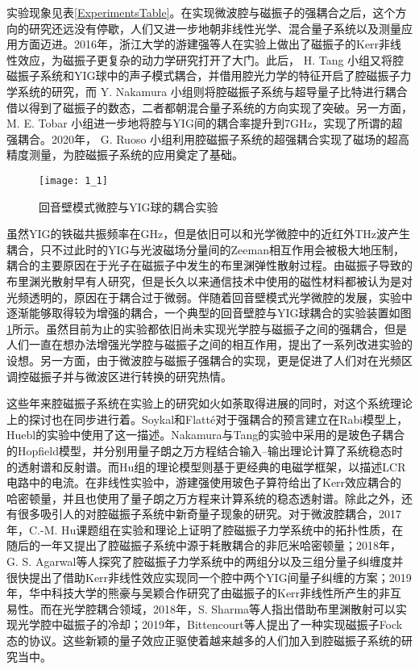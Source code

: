 实验现象见表\ref{ExperimentsTable}。在实现微波腔与磁振子的强耦合之后，这个方向的研究还远没有停歇，人们又进一步地朝非线性光学、混合量子系统以及测量应用方面迈进。2016年，浙江大学的游建强等人在实验上做出了磁振子的Kerr非线性效应\cite{PhysRevB.94.224410You}，为磁振子更复杂的动力学研究打开了大门。此后， H. Tang 小组又将腔磁振子系统和YIG球中的声子模式耦合\cite{10.1126/sciadv.1501286Tang}，并借用腔光力学的特征开启了腔磁振子力学系统的研究，而 Y. Nakamura 小组则将腔磁振子系统与超导量子比特进行耦合借以得到了磁振子的数态\cite{10.1126/sciadv.1603150Nakamura}，二者都朝混合量子系统的方向实现了突破。另一方面， M. E. Tobar 小组进一步地将腔与YIG间的耦合率提升到7GHz，实现了所谓的超强耦合\cite{PhysRevB.93.144420Tobar}。2020年， G. Ruoso 小组利用腔磁振子系统的超强耦合实现了磁场的超高精度测量\cite{10.1063/5.0024369Ruoso}，为腔磁振子系统的应用奠定了基础。

\begin{figure}[htbp]
	\centering
	\texttt{[image: 1\_1]}
	\caption{回音壁模式微腔与YIG球的耦合实验\cite{PhysRevLett.116.223601Nakamura}} 
	\label{FigOpticalCavity}
\end{figure}
虽然YIG的铁磁共振频率在GHz，但是依旧可以和光学微腔中的近红外THz波产生耦合，只不过此时的YIG与光波磁场分量间的Zeeman相互作用会被极大地压制，耦合的主要原因在于光子在磁振子中发生的布里渊弹性散射过程。由磁振子导致的布里渊光散射早有人研究，但是长久以来通信技术中使用的磁性材料都被认为是对光频透明的，原因在于耦合过于微弱。伴随着回音壁模式光学微腔的发展，实验中逐渐能够取得较为增强的耦合，一个典型的回音壁腔与YIG球耦合的实验装置如图\ref{FigOpticalCavity}所示。虽然目前为止的实验都依旧尚未实现光学腔与磁振子之间的强耦合，但是人们一直在想办法增强光学腔与磁振子之间的相互作用，提出了一系列改进实验的设想\cite{Pantazopoulos_2018,PhysRevB.98.241406Graf,PhysRevResearch.3.013277Graf}。另一方面，由于微波腔与磁振子强耦合的实现，更是促进了人们对在光频区调控磁振子并与微波区进行转换的研究热情。

这些年来腔磁振子系统在实验上的研究如火如荼取得进展的同时，对这个系统理论上的探讨也在同步进行着。Soykal和Flatt\'e对于强耦合的预言建立在Rabi模型上，Huebl的实验中使用了这一描述。Nakamura与Tang的实验中采用的是玻色子耦合的Hopfield模型，并分别用量子朗之万方程结合输入--输出理论计算了系统稳态时的透射谱和反射谱。而Hu组的理论模型则基于更经典的电磁学框架，以描述LCR电路中的电流。在非线性实验中，游建强使用玻色子算符给出了Kerr效应耦合的哈密顿量，并且也使用了量子朗之万方程来计算系统的稳态透射谱。除此之外，还有很多吸引人的对腔磁振子系统中新奇量子现象的研究。对于微波腔耦合，2017年，C.-M. Hu课题组在实验和理论上证明了腔磁振子力学系统中的拓扑性质\cite{PhysRevB.95.214411Hu}，在随后的一年又提出了腔磁振子系统中源于耗散耦合的非厄米哈密顿量\cite{PhysRevLett.121.137203Hu}；2018年，G. S. Agarwal等人探究了腔磁振子力学系统中的两组分以及三组分量子纠缠度并很快提出了借助Kerr非线性效应实现同一个腔中两个YIG间量子纠缠的方案\cite{PhysRevLett.121.203601Agarwal}；2019年，华中科技大学的熊豪与吴颖合作研究了由磁振子的Kerr非线性所产生的非互易性\cite{PhysRevApplied.12.034001Xiong}。而在光学腔耦合领域，2018年，S. Sharma等人指出借助布里渊散射可以实现光学腔中磁振子的冷却\cite{PhysRevLett.121.087205Sharma}；2019年，Bittencourt等人提出了一种实现磁振子Fock态的协议\cite{PhysRevA.100.013810Bittencourt}。这些新颖的量子效应正驱使着越来越多的人们加入到腔磁振子系统的研究当中。

